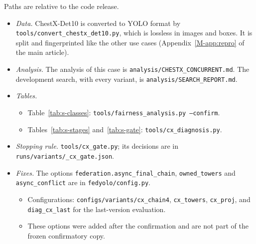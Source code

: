 \documentclass[pdflatex,sn-mathphys-num]{sn-jnl}
\begin{document}
Paths are relative to the code release.
\begin{itemize}
\item \emph{Data.} ChestX-Det10 is converted to YOLO format by \texttt{tools/convert\_chestx\_det10.py}, which is lossless in images and boxes. It is split and fingerprinted like the other use cases (Appendix~\ref{M-app:repro} of the main article).
\item \emph{Analysis.} The analysis of this case is \texttt{analysis/CHESTX\_CONCURRENT.md}. The development search, with every variant, is \texttt{analysis/SEARCH\_REPORT.md}.
\item \emph{Tables.}
  \begin{itemize}
  \item Table~\ref{tab:s-classes}: \texttt{tools/fairness\_analysis.py --confirm}.
  \item Tables~\ref{tab:s-stages} and~\ref{tab:s-gate}: \texttt{tools/cx\_diagnosis.py}.
  \end{itemize}
\item \emph{Stopping rule.} \texttt{tools/cx\_gate.py}; its decisions are in \texttt{runs/variants/\_cx\_gate.json}.
\item \emph{Fixes.} The options \texttt{federation.async\_final\_chain}, \texttt{owned\_towers} and \texttt{async\_conflict} are in \texttt{fedyolo/config.py}.
  \begin{itemize}
  \item Configurations: \texttt{configs/variants/cx\_chain4}, \texttt{cx\_towers}, \texttt{cx\_proj}, and \texttt{diag\_cx\_last} for the last-version evaluation.
  \item These options were added after the confirmation and are not part of the frozen confirmatory copy.
  \end{itemize}
\end{itemize}


\end{document}
